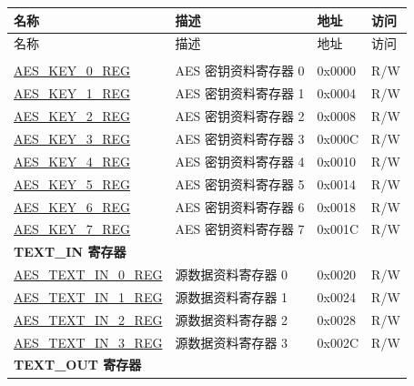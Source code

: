 \begin{longtable}{ | p{5.2cm} | p{6.6cm} | p{2cm} | p{1.2cm} | }
\hline\rowcolor{lightgray}
名称 & 描述 &  地址 & 访问 \\ \hline
\endfirsthead
        \hline
        \rowcolor{lightgray}
       名称 & 描述 & 地址 & 访问  \\
        \hline
        \endhead
        \endfoot

\multicolumn{4}{|l|}{\textbf{密钥寄存器}} \\ \hline

\hyperref[regdesc:AESKEYnREG]{AES\_KEY\_0\_REG}				&	AES 密钥资料寄存器 0				& 0x0000 & R/W \\ \hline
\hyperref[regdesc:AESKEYnREG]{AES\_KEY\_1\_REG}				&	AES 密钥资料寄存器 1				& 0x0004 & R/W \\ \hline
\hyperref[regdesc:AESKEYnREG]{AES\_KEY\_2\_REG}				&	AES 密钥资料寄存器 2				& 0x0008 & R/W \\ \hline
\hyperref[regdesc:AESKEYnREG]{AES\_KEY\_3\_REG}				&	AES 密钥资料寄存器 3				& 0x000C & R/W \\ \hline
\hyperref[regdesc:AESKEYnREG]{AES\_KEY\_4\_REG}				&	AES 密钥资料寄存器 4				& 0x0010 & R/W \\ \hline
\hyperref[regdesc:AESKEYnREG]{AES\_KEY\_5\_REG}				&	AES 密钥资料寄存器 5				& 0x0014 & R/W \\ \hline
\hyperref[regdesc:AESKEYnREG]{AES\_KEY\_6\_REG}				&	AES 密钥资料寄存器 6				& 0x0018 & R/W \\ \hline
\hyperref[regdesc:AESKEYnREG]{AES\_KEY\_7\_REG}				&	AES 密钥资料寄存器 7				& 0x001C & R/W \\ \hline

\multicolumn{4}{|l|}{\textbf{TEXT\_IN 寄存器}} \\ \hline

\hyperref[regdesc:AESTEXTINnREG]{AES\_TEXT\_IN\_0\_REG}			&	源数据资料寄存器 0					& 0x0020 & R/W \\ \hline
\hyperref[regdesc:AESTEXTINnREG]{AES\_TEXT\_IN\_1\_REG}			&	源数据资料寄存器 1					& 0x0024 & R/W \\ \hline
\hyperref[regdesc:AESTEXTINnREG]{AES\_TEXT\_IN\_2\_REG}			&	源数据资料寄存器 2					& 0x0028 & R/W \\ \hline
\hyperref[regdesc:AESTEXTINnREG]{AES\_TEXT\_IN\_3\_REG}			&	源数据资料寄存器 3					& 0x002C & R/W \\ \hline

\multicolumn{4}{|l|}{\textbf{TEXT\_OUT 寄存器}} \\ \hline


\end{longtable}
